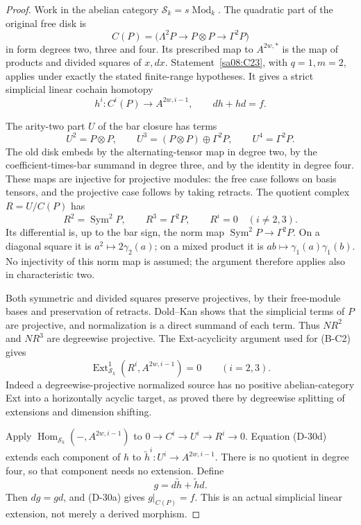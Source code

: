\begin{proof}
Work in the abelian category
\(\mathcal S_k=s\operatorname{Mod}_k\).
The quadratic part of the original free disk is
\[
 C(P)=\bigl(\Lambda^2P\longrightarrow P\otimes P
                         \longrightarrow\Gamma^2P\bigr)
\]
in form degrees two, three and four. Its prescribed
map to \(A^{2w,*}\) is the map of products and divided
squares of \(x,dx\).
Statement~\ref{sa08:C23}, with \(q=1,m=2\), applies
under exactly the stated finite-range hypotheses.
It gives a strict simplicial linear cochain homotopy
\[
 h^i:C^i(P)\longrightarrow A^{2w,i-1},\qquad
                  dh+hd=f.
 \tag{D-30a}
\]

The arity-two part \(U\) of the bar closure has terms
\[
 U^2=P\otimes P,\qquad
 U^3=(P\otimes P)\oplus\Gamma^2P,\qquad
 U^4=\Gamma^2P.
 \tag{D-30b}
\]
The old disk embeds by the alternating-tensor map
in degree two, by the coefficient-times-bar summand
in degree three, and by the identity in degree four.
These maps are injective for projective modules:
the free case follows on basis tensors, and the
projective case follows by taking retracts.
The quotient complex \(R=U/C(P)\) has
\[
 R^2=\operatorname{Sym}^2P,
 \qquad R^3=\Gamma^2P,
 \qquad R^i=0\quad(i\ne2,3).
 \tag{D-30c}
\]
Its differential is, up to the bar sign, the norm
map \(\operatorname{Sym}^2P\to\Gamma^2P\).
On a diagonal square it is \(a^2\mapsto2\gamma_2(a)\);
on a mixed product it is \(ab\mapsto\gamma_1(a)\gamma_1(b)\).
No injectivity of this norm map is assumed; the
argument therefore applies also in characteristic two.

Both symmetric and divided squares preserve
projectives, by their free-module bases and preservation
of retracts. Dold--Kan shows that the simplicial terms
of \(P\) are projective, and normalization is a direct
summand of each term. Thus \(NR^2\) and \(NR^3\) are
degreewise projective. The Ext-acyclicity argument
used for (B-C2) gives
\[
 \operatorname{Ext}^1_{\mathcal S_k}
       (R^i,A^{2w,i-1})=0\qquad(i=2,3).
 \tag{D-30d}
\]
Indeed a degreewise-projective normalized source
has no positive abelian-category Ext into a horizontally
acyclic target, as proved there by degreewise splitting
of extensions and dimension shifting.

Apply \(\operatorname{Hom}_{\mathcal S_k}
(-,A^{2w,i-1})\) to
\(0\to C^i\to U^i\to R^i\to0\).
Equation (D-30d) extends each component of \(h\) to
\(\widetilde h^i:U^i\to A^{2w,i-1}\).
There is no quotient in degree four, so that component
needs no extension. Define
\[
                    g=d\widetilde h+\widetilde h d.
 \tag{D-30e}
\]
Then \(dg=gd\), and (D-30a) gives \(g|_{C(P)}=f\).
This is an actual simplicial linear extension, not
merely a derived morphism.


\end{proof}
